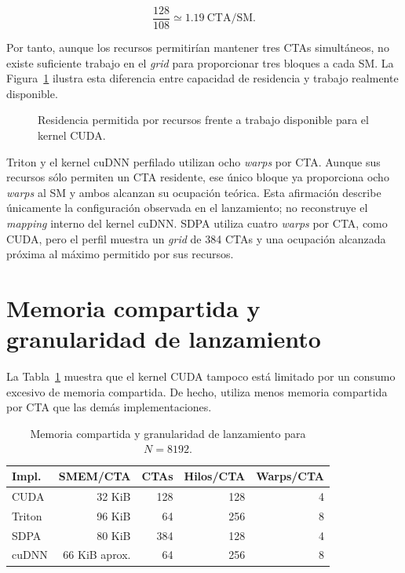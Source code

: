 \begin{equation}
\frac{128}{108}\simeq 1.19\ \text{CTA/SM}.
\end{equation}

Por tanto, aunque los recursos permitirían mantener tres CTAs simultáneos, no existe suficiente trabajo en el \textit{grid} para proporcionar tres bloques a cada SM. La Figura~\ref{fig:occupancy_grid} ilustra esta diferencia entre capacidad de residencia y trabajo realmente disponible.

\begin{figure}[H]
\centering
{}
\caption{Residencia permitida por recursos frente a trabajo disponible para el kernel CUDA.}
\label{fig:occupancy_grid}
\end{figure}

Triton y el kernel cuDNN perfilado utilizan ocho \textit{warps} por CTA. Aunque sus recursos sólo permiten un CTA residente, ese único bloque ya proporciona ocho \textit{warps} al SM y ambos alcanzan su ocupación teórica. Esta afirmación describe únicamente la configuración observada en el lanzamiento; no reconstruye el \textit{mapping} interno del kernel cuDNN. SDPA utiliza cuatro \textit{warps} por CTA, como CUDA, pero el perfil muestra un \textit{grid} de 384 CTAs y una ocupación alcanzada próxima al máximo permitido por sus recursos.

\section{Memoria compartida y granularidad de lanzamiento}

La Tabla~\ref{tab:launch_smem} muestra que el kernel CUDA tampoco está limitado por un consumo excesivo de memoria compartida. De hecho, utiliza menos memoria compartida por CTA que las demás implementaciones.

\begin{table}[H]
\centering
\caption{Memoria compartida y granularidad de lanzamiento para \(N=8192\).}
\label{tab:launch_smem}
\begin{tabular}{lrrrr}
\toprule
\textbf{Impl.} & \textbf{SMEM/CTA} & \textbf{CTAs} & \textbf{Hilos/CTA} & \textbf{Warps/CTA} \\
\midrule
CUDA   & 32 KiB & 128 & 128 & 4 \\
Triton & 96 KiB & 64  & 256 & 8 \\
SDPA   & 80 KiB & 384 & 128 & 4 \\
cuDNN  & 66 KiB aprox. & 64 & 256 & 8 \\
\bottomrule
\end{tabular}
\end{table}

